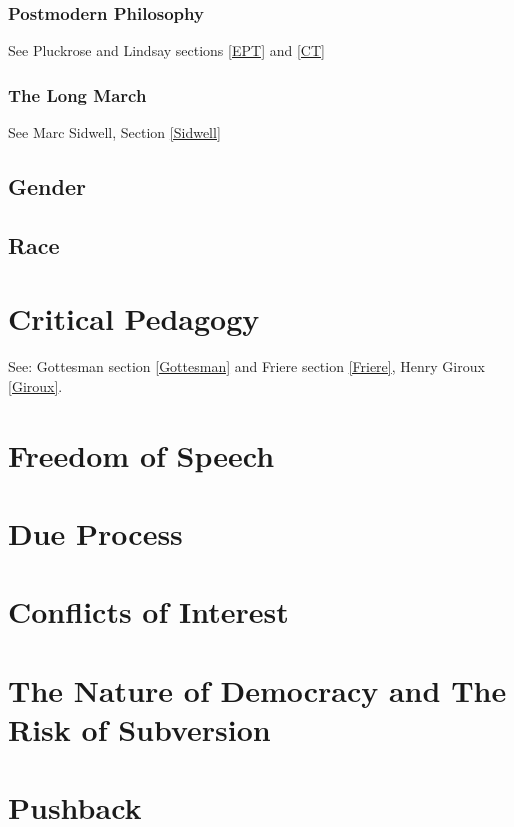 \documentclass[10pt,titlepage]{book}
\begin{document}
\subsubsection{Postmodern Philosophy}

See Pluckrose and Lindsay sections \ref{EPT} and \ref{CT} 

\subsubsection{The Long March}\label{LongMarch}

See Marc Sidwell, Section \ref{Sidwell}

\subsection{Gender}

\subsection{Race}

\section{Critical Pedagogy}

See: Gottesman section \ref{Gottesman} and Friere section \ref{Friere}, Henry Giroux \ref{Giroux}.


\section{Freedom of Speech}

\section{Due Process}

\section{Conflicts of Interest}

\section{The Nature of Democracy and The Risk of Subversion}

\section{Pushback}
\end{document}
